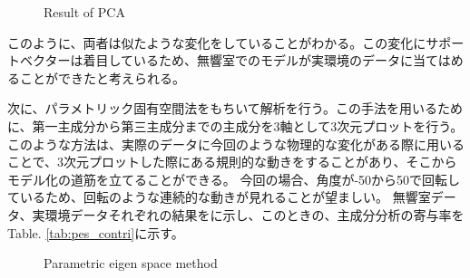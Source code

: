 \begin{figure}[tb]
    \centering
    \label{fig:pca_check_anechoic}
    \label{fig:pca_check_real}
    \caption{Result of PCA}
    \label{fig:pca_check}
\end{figure}

このように、両者は似たような変化をしていることがわかる。この変化にサポートベクターは着目しているため、無響室でのモデルが実環境のデータに当てはめることができたと考えられる。

次に、パラメトリック固有空間法をもちいて解析を行う。この手法を用いるために、第一主成分から第三主成分までの主成分を3軸として3次元プロットを行う。このような方法は、実際のデータに今回のような物理的な変化がある際に用いることで、3次元プロットした際にある規則的な動きをすることがあり、そこからモデル化の道筋を立てることができる。
今回の場合、角度が-50から50で回転しているため、回転のような連続的な動きが見れることが望ましい。
無響室データ、実環境データそれぞれの結果をに示し、このときの、主成分分析の寄与率をTable. \ref{tab:pes_contri}に示す。

\begin{figure}[tb]
    \centering
    \label{fig:pes_check_anechoic}
    \label{fig:pes_check_real}
    \caption{Parametric eigen space method}
    \label{fig:pes_check}
\end{figure}

